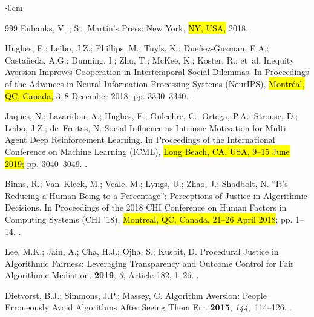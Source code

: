 \documentclass[mca,article,accept,pdftex,oneauthor]{Definitions/mdpi}
\begin{document}
\begin{adjustwidth}{-\extralength}{0cm}
\begin{thebibliography}{999}
Eubanks, V.
; St. Martin's Press: New York, \hl{NY, USA,} 2018.

Hughes, E.; Leibo, J.Z.; Phillips, M.; Tuyls, K.; Due{\~n}ez-Guzman, E.A.;
  Casta{\~n}eda, A.G.; Dunning, I.; Zhu, T.; McKee, K.; Koster, R.;  et~al.
\newblock Inequity Aversion Improves Cooperation in Intertemporal Social
  Dilemmas.
\newblock In Proceedings of the Advances in Neural Information Processing
  Systems (NeurIPS),  \hl{Montréal, QC, Canada,}  3--8 December 2018; pp. 3330--3340.
.

Jaques, N.; Lazaridou, A.; Hughes, E.; Gulcehre, C.; Ortega, P.A.; Strouse, D.;
  Leibo, J.Z.; de~Freitas, N.
\newblock Social Influence as Intrinsic Motivation for Multi-Agent Deep
  Reinforcement Learning.
\newblock In Proceedings of the International Conference on Machine Learning
  (ICML),   \hl{Long Beach, CA, USA, 9--15 June 2019;} pp. 3040--3049.
.

Binns, R.; Van~Kleek, M.; Veale, M.; Lyngs, U.; Zhao, J.; Shadbolt, N.
\newblock ``It's Reducing a Human Being to a Percentage'': Perceptions of
  Justice in Algorithmic Decisions.
\newblock In Proceedings of the 2018 CHI Conference on Human Factors in
  Computing Systems (CHI '18), \hl{Montreal, QC, Canada, 21--26 April 2018}; pp. 1--14.
.

Lee, M.K.; Jain, A.; Cha, H.J.; Ojha, S.; Kusbit, D.
\newblock Procedural Justice in Algorithmic Fairness: Leveraging Transparency
  and Outcome Control for Fair Algorithmic Mediation.
 {\bf
  2019}, {\em 3}, Article 182, 1--26.
.

Dietvorst, B.J.; Simmons, J.P.; Massey, C.
\newblock Algorithm Aversion: People Erroneously Avoid Algorithms After Seeing
  Them Err.
 {\bf 2015}, {\em
  144},~114--126.
.


\end{thebibliography}
\end{adjustwidth}
\end{document}
